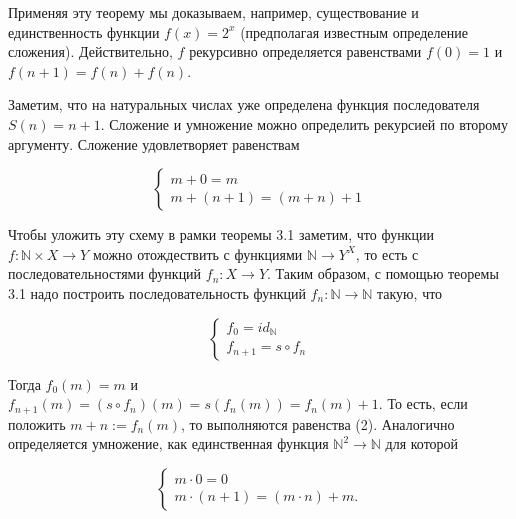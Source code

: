 Применяя эту теорему мы доказываем, например, существование и единственность функции $f(x) = 2^x$ (предполагая известным определение сложения). Действительно, $f$ рекурсивно определяется равенствами $f(0) = 1$ и $ f(n+1) = f(n) + f(n)$.

Заметим, что на натуральных числах уже определена функция последователя $S(n) = n+1$. Сложение и умножение можно определить рекурсией по второму аргументу. Сложение удовлетворяет равенствам

\begin{equation}
\left\{\begin{array}{l}
{m + 0 = m} \\
{m + (n + 1) = (m + n) + 1}
\end{array}\right.
\end{equation}

Чтобы уложить эту схему в рамки теоремы 3.1 заметим, что функции $f : \mathbb{N} \times X \rightarrow Y$ можно отождествить с функциями $\mathbb{N} \rightarrow Y^X$, то есть с
последовательностями функций $f_n : X \rightarrow Y$. Таким образом, с помощью
теоремы 3.1 надо построить последовательность функций $f_n : \mathbb{N} \rightarrow \mathbb{N}$ такую, что

\begin{equation}
\left\{\begin{array}{l}
{f_0 = id_\mathbb{N}} \\
{f_{n+1} = s \circ f_n}
\end{array}\right.
\end{equation}

Тогда $f_0 (m) = m$ и $f_{n+1} (m) = (s \circ f_n) (m) = s(f_n (m)) = f_n (m) + 1$. То есть, если положить $m+n := f_n (m)$, то выполняются равенства (2).
Аналогично определяется умножение, как единственная функция $\mathbb{N}^2 \rightarrow \mathbb{N}$ для которой

\begin{equation}
\left\{\begin{array}{l}
{m \cdot 0 = 0} \\
{m \cdot (n+1) = (m \cdot n) + m}.
\end{array}\right.
\end{equation}